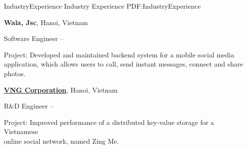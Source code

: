 \documentclass[letterpaper,MMMyyyy,nonstopmode]{simpleresumecv}
\begin{document}
\begin{Body}

\begin{comment}

\Section
{Campus Activities}
{Campus Activities}
{PDF:CampusActivities}

\Entry
\href{http://www.example.com/my-club}
{\textbf{First Volunteers Club}},
First American University

\Gap
\BulletItem
President
\hfill
\DatestampYMD{2006}{08}{15} --
\DatestampYMD{2007}{08}{15}
\begin{Detail}
\SubBulletItem
Lorem ipsum dolor sit amet, consectetur adipiscing elit.
\SubBulletItem
Curabitur vitae laoreet velit, vel ultricies est. Nam nec elit ac ante facilisis ultrices.
\SubBulletItem
Integer sit amet turpis dolor. Lorem ipsum dolor sit amet, consectetur adipiscing elit. Nunc at orci eu leo vulputate finibus sed et sem.
\SubBulletItem
Suspendisse volutpat sapien et mi cursus, gravida ornare mauris sollicitudin.
\end{Detail}

\end{comment}



\Section
{Industry\newline Experience}
{Industry Experience}
{PDF:IndustryExperience}

\Entry
{\textbf{Wala, Jsc}}, Hanoi, Vietnam

\Gap
\BulletItem
Software Engineer
\hfill
{} -- 
\begin{Detail}
\SubBulletItem
Project: Developed and maintained backend system for a mobile social media \\
application, which allows users to call, send instant messages, connect and share photos. 
\end{Detail}

\BigGap

\Entry
\href{https://www.vng.com.vn/en/index.html}
{\textbf{VNG Corporation}}, Hanoi, Vietnam

\Gap
\BulletItem
R\&D Engineer
\hfill
{} -- 
\begin{Detail}
\SubBulletItem
Project: Improved performance of a distributed key-value storage for a Vietnamese \\
online social network, named Zing Me. 
\end{Detail}


\end{Body}
\end{document}
